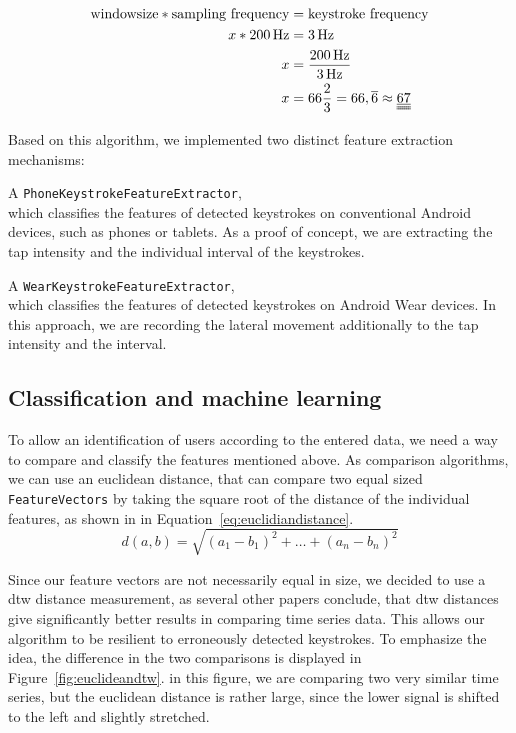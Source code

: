 \begin{equation}\label{eq:windowsize}\begin{split}
\textrm{windowsize} * \textrm{sampling frequency} & = \textrm{keystroke frequency}\\
x * \SI{200}{Hz} & = \SI{3}{Hz}\\
x & = \frac{\SI{200}{Hz}}{\SI{3}{Hz}}\\
x & = 66 \frac{2}{3} = 66,\overline{6} \approx \uuline{\underline{67}}
\end{split}\end{equation}

Based on this algorithm, we implemented two distinct feature extraction mechanisms:

A \lstinline$PhoneKeystrokeFeatureExtractor$,\\
which classifies the features of detected keystrokes on conventional Android devices, such as phones or tablets. As a proof of concept, we are extracting the tap intensity and the individual interval of the keystrokes.
    
A \lstinline$WearKeystrokeFeatureExtractor$,\\
which classifies the features of detected keystrokes on Android Wear devices. In this approach, we are recording the lateral movement additionally to the tap intensity and the interval.

\subsection{Classification and machine learning}
To allow an identification of users according to the entered data, we need a way to compare and classify the features mentioned above. 
As comparison algorithms, we can use an euclidean distance, that can compare two equal sized \lstinline$FeatureVectors$ by taking the square root of the distance of the individual features, as shown in in Equation~\ref{eq:euclidiandistance}.
\begin{equation}\label{eq:euclidiandistance}
d(a, b) = \sqrt{(a_1 - b_1)^2 + \ldots + (a_n - b_n)^2}
\end{equation}

Since our feature vectors are not necessarily equal in size, we decided to use a \gls{dtw} distance measurement, as several other papers conclude, that \gls{dtw} distances give significantly better results in comparing time series data\cite{ding2008querying}. This allows our algorithm to be resilient to erroneously detected keystrokes. To emphasize the idea, the difference in the two comparisons is displayed in Figure~\ref{fig:euclideandtw}. in this figure, we are comparing two very similar time series, but the euclidean distance is rather large, since the lower signal is shifted to the left and slightly stretched.

